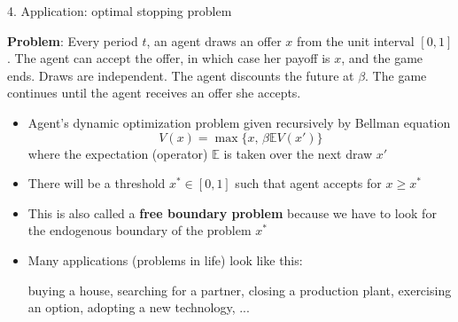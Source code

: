 \documentclass[11pt, aspectratio=169]{beamer}
\begin{document}
\begin{frame}{4. Application: optimal stopping problem}

\vspace{5mm}
\textbf{Problem}: Every period $t$, an agent draws an offer $x$ from the unit interval $[0, 1]$. The agent can accept the offer, in which case her payoff is $x$, and the game ends. Draws are independent. The agent discounts the future at $\beta$. The game continues until the agent receives an offer she accepts.

\vspace{5mm}
\begin{itemize}
\item Agent's dynamic optimization problem given recursively by Bellman equation 
\begin{equation*}
	V(x) = \max \Big\{ x, \, \beta \mathbb{E} V(x') \Big\}
\end{equation*}
where the expectation (operator) $\mathbb{E}$ is taken over the next draw $x'$

\item There will be a threshold $x^* \in [0, 1]$ such that agent accepts for $x \geq x^*$

\item This is also called a \textbf{free boundary problem} because we have to look for the endogenous boundary of the problem $x^*$

\item Many applications (problems in life) look like this: 

buying a house, searching for a partner, closing a production plant, exercising an option, adopting a new technology, ... 

\end{itemize}

\end{frame}
\end{document}
